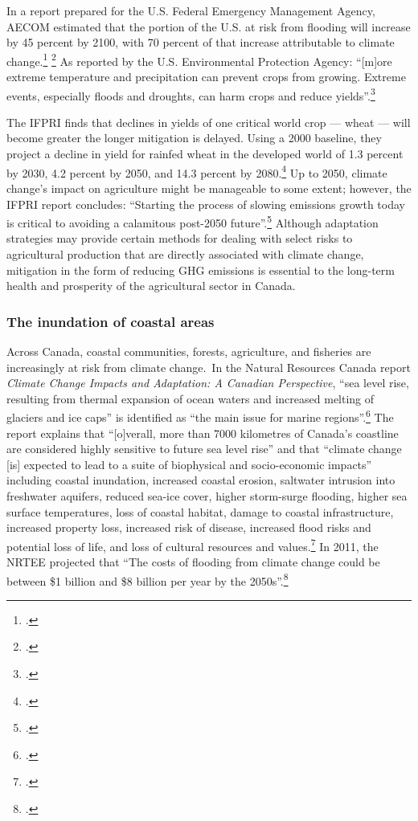 In a report prepared for the U.S. Federal Emergency Management Agency, AECOM estimated that the portion of the U.S. at risk from flooding will increase by 45 percent by 2100, with 70 percent of that increase attributable to climate change.\footcite[][p. ES-7]{FEMAFlood} \footcite[See also: ][]{MJFlood}
As reported by the U.S. Environmental Protection Agency: ``[m]ore extreme temperature and precipitation can prevent crops from growing. Extreme events, especially floods and droughts, can harm crops and reduce yields''.\footcite[][]{EPAAgFoodImpacts}



The IFPRI finds that declines in yields of one critical world crop --- wheat --- will become greater the longer mitigation is delayed. 
Using a 2000 baseline, they project a decline in yield for rainfed wheat in the developed world of 1.3 percent by 2030, 4.2 percent by 2050, and 14.3 percent by 2080.\footcite[][p. 85]{Farming2050}
Up to 2050, climate change's impact on agriculture might be manageable to some extent; however, the IFPRI report concludes: ``Starting the process of slowing emissions growth today is critical to avoiding a calamitous post-2050 future''.\footcite[][p. xxi]{Farming2050}
Although adaptation strategies may provide certain methods for dealing with select risks to agricultural production that are directly associated with climate change, mitigation in the form of reducing GHG emissions is essential to the long-term health and prosperity of the agricultural sector in Canada.



	\subsubsection{The inundation of coastal areas}
	\label{sec:inundationcoastal}

	
	
Across Canada, coastal communities, forests, agriculture, and fisheries are increasingly at risk from climate change.\
In the Natural Resources Canada report \emph{Climate Change Impacts and Adaptation: A Canadian Perspective}, ``sea level rise, resulting from thermal expansion of ocean waters and increased melting of glaciers and ice caps'' is identified as ``the main issue for marine regions''.\footcite[][p. xvi]{Lemmen2010}
The report explains that ``[o]verall, more than 7000 kilometres of Canada's coastline are considered highly sensitive to future sea level rise'' and that ``climate change [is] expected to lead to a suite of biophysical and socio-economic impacts'' including coastal inundation, increased coastal erosion, saltwater intrusion into freshwater aquifers, reduced sea-ice cover, higher storm-surge flooding, higher sea surface temperatures, loss of coastal habitat, damage to coastal infrastructure, increased property loss, increased risk of disease, increased flood risks and potential loss of life, and loss of cultural resources and values.\footcite[][p. xvii]{Lemmen2010}
In 2011, the NRTEE projected that ``The costs of flooding from climate change could be between \$1 billion and \$8 billion per year by the 2050s''.\footcite[][p.16]{NRTEEPrice}



